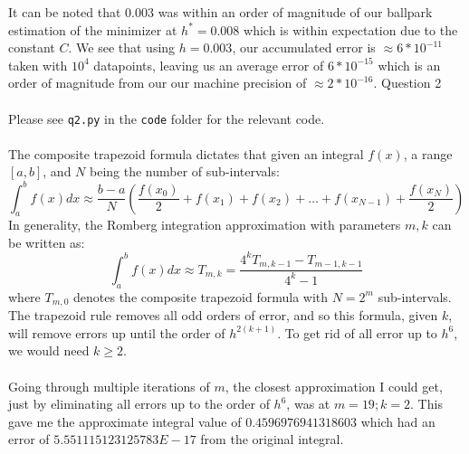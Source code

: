\documentclass[10pt]{article} %
\begin{document}
\vspace{1em}
 It can be noted that 0.003 was within an order of magnitude of our ballpark estimation of the minimizer at $h^* = 0.008$ which is within expectation due to the constant $C$. We see that using $h=0.003$, our accumulated error is $\approx  6 * 10^{-11}$ taken with $10^{4}$ datapoints, leaving us an average error of $6 * 10^{-15}$ which is an order of magnitude from our our machine precision of $\approx 2 * 10^{-16}$.
\newpage
\noindent \Large{Question 2}
\\ \\
\normalsize{Please see \texttt{q2.py} in the \texttt{code} folder for the relevant code.}
\\ \\
The composite trapezoid formula dictates that given an integral $f(x)$, a range $[a,b]$, and $N$ being the number of sub-intervals:
\begin{equation}
	\int_{a}^{b}f(x)dx \approx \frac{b-a}{N}\left( \frac{f(x_0)}{2} + f(x_1) + f(x_2) + \ldots + f(x_{N-1})+\frac{f(x_N)}{2} \right)
\end{equation}
In generality, the Romberg integration approximation with parameters $m,k$ can be written as:
\begin{equation}
	\int_{a}^{b}f(x)dx \approx T_{m,k} = \frac{4^k T_{m,k-1} - T_{m-1,k-1}}{4^k - 1}
\end{equation}
where $T_{m,0}$ denotes the composite trapezoid formula with $N = 2^{m}$ sub-intervals. The trapezoid rule removes all odd orders of error, and so this formula, given $k$, will remove errors up until the order of $h^{2(k+1)}$. To get rid of all error up to $h^6$, we would need $k\geq2.$
\\ \\
Going through multiple iterations of $m$, the closest approximation I could get, just by eliminating all errors up to the order of $h^6$, was at $m=19; k=2$. This gave me the approximate integral value of $0.4596976941318603$ which had an error of $5.551115123125783E-17$ from the original integral.
\end{document}
